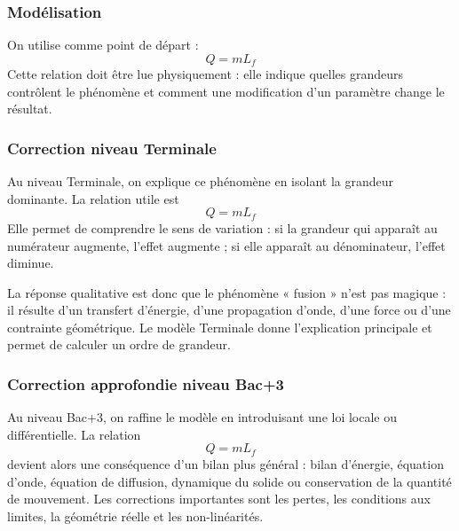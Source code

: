 \documentclass[11pt,a4paper]{article}
\begin{document}
\subsubsection*{Modélisation}

\begin{theorembox}
On utilise comme point de départ :
\[
Q=mL_f
\]
Cette relation doit être lue physiquement : elle indique quelles grandeurs contrôlent le phénomène et comment une modification d'un paramètre change le résultat.
\end{theorembox}

\subsubsection*{Correction niveau Terminale}

\begin{corrigebox}

Au niveau Terminale, on explique ce phénomène en isolant la grandeur dominante. La relation utile est
\[
Q=mL_f
\]
Elle permet de comprendre le sens de variation : si la grandeur qui apparaît au numérateur augmente, l'effet augmente ; si elle apparaît au dénominateur, l'effet diminue.

La réponse qualitative est donc que le phénomène « fusion » n'est pas magique : il résulte d'un transfert d'énergie, d'une propagation d'onde, d'une force ou d'une contrainte géométrique. Le modèle Terminale donne l'explication principale et permet de calculer un ordre de grandeur.

\end{corrigebox}

\subsubsection*{Correction approfondie niveau Bac+3}

\begin{approfondissementbox}

Au niveau Bac+3, on raffine le modèle en introduisant une loi locale ou différentielle. La relation
\[
Q=mL_f
\]
devient alors une conséquence d'un bilan plus général : bilan d'énergie, équation d'onde, équation de diffusion, dynamique du solide ou conservation de la quantité de mouvement. Les corrections importantes sont les pertes, les conditions aux limites, la géométrie réelle et les non-linéarités.

\end{approfondissementbox}
\end{document}
